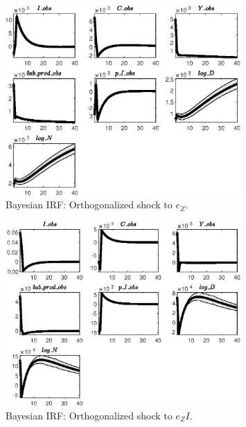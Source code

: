  
\begin{figure}[H]
\centering 
\includegraphics[width=0.80\textwidth]{BRS_fd/Output/BRS_fd_Bayesian_IRF_e_Z_1}
\caption{Bayesian IRF: Orthogonalized shock to ${e_Z}$.}
\label{Fig:BayesianIRF:e_Z:1}
\end{figure}
 
\begin{figure}[H]
\centering 
\includegraphics[width=0.80\textwidth]{BRS_fd/Output/BRS_fd_Bayesian_IRF_e_ZI_1}
\caption{Bayesian IRF: Orthogonalized shock to ${e_ZI}$.}
\label{Fig:BayesianIRF:e_ZI:1}
\end{figure}
 
